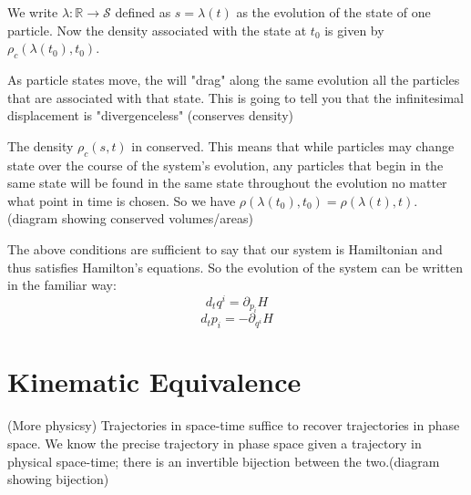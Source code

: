 \documentclass{article}
\begin{document}
\begin{defn}
	We write $\lambda: \mathbb{R} \rightarrow \mathcal{S}$ defined as $s = \lambda(t)$ as the evolution of the state of one particle. Now the density associated with the state at $t_0$ is given by $\rho_c(\lambda(t_0),t_0)$.
\end{defn}

	
As particle states move, the will "drag" along the same evolution all the particles that are associated with that state. This is going to tell you that the infinitesimal displacement is "divergenceless" (conserves density)

\begin{prop}
	The density $\rho_c(s,t)$ in conserved. This means that while particles may change state over the course of the system's evolution, any particles that begin in the same state will be found in the same state throughout the evolution no matter what point in time is chosen. So we have $\rho(\lambda(t_0),t_0) = \rho(\lambda(t),t)$. (diagram showing conserved volumes/areas)
\end{prop}

\begin{prop}
	The above conditions are sufficient to say that our system is Hamiltonian and thus satisfies Hamilton's equations. So the evolution of the system can be written in the familiar way:
	$$d_tq^i = \partial_{p_i}H$$
	$$d_tp_i = -\partial_{q^i}H$$
\end{prop} 
	

\section{Kinematic Equivalence}

\begin{assump}
	(More physicsy) Trajectories in space-time suffice to recover trajectories in phase space. We know the precise trajectory in phase space given a trajectory in physical space-time; there is an invertible bijection between the two.(diagram showing bijection)
\end{assump}
\end{document}
